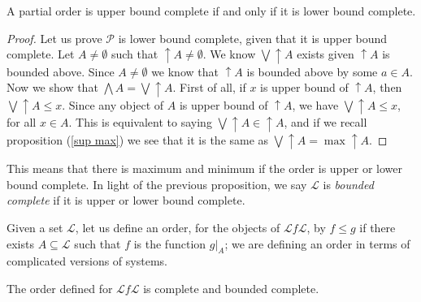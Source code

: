 \documentclass [12pt]{book}
\begin{document}
\begin{proposition}A partial order is upper bound complete if and only if it is lower bound complete.\end{proposition}

\begin{proof}Let us prove $\mathcal P$ is lower bound complete, given that it is upper bound complete. Let $A\neq\emptyset$ such that $\uparrow A\neq\emptyset$. We know $\bigvee\uparrow A$ exists given $\uparrow A$ is bounded above. Since $A\neq\emptyset$ we know that $\uparrow A$ is bounded above by some $a\in A$. Now we show that $\bigwedge A=\bigvee\uparrow A$. First of all, if $x$ is upper bound of $\uparrow A$, then $\bigvee\uparrow A\leq x$. Since any object of $A$ is upper bound of $\uparrow A$, we have $\bigvee\uparrow A\leq x$, for all $x\in A$. This is equivalent to saying $\bigvee\uparrow A\in\uparrow A$, and if we recall proposition (\ref{sup max}) we see that it is the same as $\bigvee\uparrow A=\max\uparrow A$.\end{proof}

This means that there is maximum and minimum if the order is upper or lower bound complete. In light of the previous proposition, we say $\mathcal L$ is \textit{bounded complete} if it is upper or lower bound complete.

Given a set $\mathcal L$, let us define an order, for the objects of $\mathcal Lf\mathcal L$, by $f\leq g$ if there exists $A\subseteq\mathcal L$ such that $f$ is the function $g|_{A}$; we are defining an order in terms of complicated versions of systems.

\begin{proposition}The order defined for $\mathcal Lf\mathcal L$ is complete and bounded complete.\end{proposition}
\end{document}

